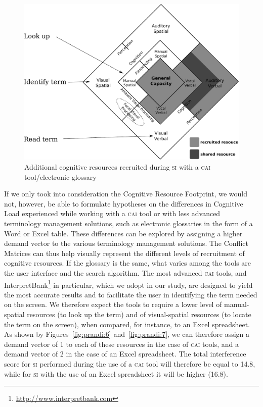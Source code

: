 \documentclass[output=paper]{langsci/langscibook}
\begin{document}
\begin{figure}
        \includegraphics[width=.7\textwidth]{figures/fig2-4.pdf}
\caption{Additional cognitive resources recruited during \textsc{si} with a \textsc{cai} tool/electronic glossary\label{fig:prandi:4}}
\end{figure}

If we only took into consideration the Cognitive Resource Footprint, we would not, however, be able to formulate hypotheses on the differences in Cognitive Load experienced while working with a \textsc{cai} tool or with less advanced terminology management solutions, such as electronic glossaries in the form of a Word or Excel table. These differences can be explored by assigning a higher demand vector to the various terminology management solutions. The Conflict Matrices can thus help visually represent the different levels of recruitment of cognitive resources. If the glossary is the same, what varies among the tools are the user interface and the search algorithm. The most advanced \textsc{cai} tools, and InterpretBank\footnote{\url{http://www.interpretbank.com}} in particular, which we adopt in our study, are designed to yield the most accurate results and to facilitate the user in identifying the term needed on the screen. We therefore expect the tools to require a lower level of manual-spatial resources (to look up the term) and of visual-spatial resources (to locate the term on the screen), when compared, for instance, to an Excel spreadsheet. As shown by Figures~\ref{fig:prandi:6} and~\ref{fig:prandi:7}, we can therefore assign a demand vector of 1 to each of these resources in the case of \textsc{cai} tools, and a demand vector of 2 in the case of an Excel spreadsheet. The total interference score for \textsc{si} performed during the use of a \textsc{cai} tool will therefore be equal to 14.8, while for \textsc{si} with the use of an Excel spreadsheet it will be higher (16.8).
\end{document}
